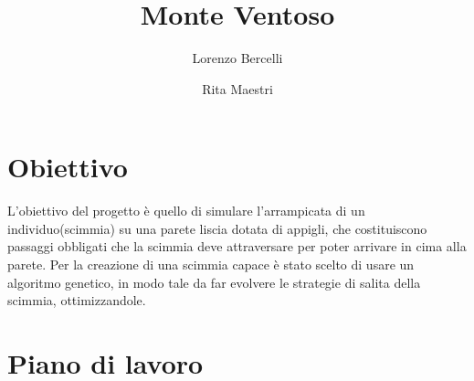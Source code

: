 \documentclass{article}
\begin{document}
	
	\title{Monte Ventoso}
	\author{Lorenzo Bercelli \and Rita Maestri}
	\maketitle
	
	\section{Obiettivo}
	L'obiettivo del progetto \`{e} quello di simulare l'arrampicata di un individuo(scimmia) su una 
	parete liscia dotata di appigli, che costituiscono passaggi obbligati che la scimmia deve attraversare per poter arrivare in cima alla parete. 
	Per la creazione di una scimmia capace \`{e} stato scelto di usare un algoritmo genetico, in modo tale da far evolvere le strategie di salita della scimmia, ottimizzandole.
	\section{Piano di lavoro}
\end{document}

